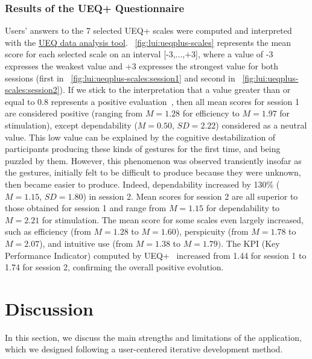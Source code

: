 \subsubsection{Results of the UEQ+ Questionnaire}
Users' answers to the 7 selected UEQ+ scales were computed and interpreted
with the \href{https://ueqplus.ueq-research.org/Material/UEQ_Plus_Data_Analysis_Tool.xlsx}{UEQ data analysis tool}. \fig~\ref{fig:lui:ueqplus-scales} represents the mean score for each selected scale on an interval [-3,...,+3], where a value of -3 expresses the weakest value and +3 expresses the strongest value for both sessions (first in \fig~\ref{fig:lui:ueqplus-scales:session1} and second in \fig~\ref{fig:lui:ueqplus-scales:session2}).
If we stick to the interpretation that a value greater than or equal to 0.8 represents a positive evaluation~\cite{Schrepp:2017}, then all mean scores for session 1 are considered positive (ranging from $M{=}1.28$ for efficiency to $M{=}1.97$ for stimulation), except dependability ($M{=}0.50$, $SD{=}2.22$) considered as a neutral value. This low value can be explained by the cognitive destabilization of participants producing these kinds of gestures for the first time, and being puzzled by them. However, this phenomenon was observed transiently insofar as the gestures, initially felt to be difficult to produce because they were unknown, then became easier to produce. Indeed, dependability increased by 130\% ($M{=}1.15$, $SD{=}1.80$) in session 2. 
Mean scores for session 2 are all superior to those obtained for session 1 and range from 
$M{=}1.15$ for dependability to $M{=}2.21$ for stimulation. The mean score for some scales even largely increased, such as efficiency (from $M{=}1.28$ to $M{=}1.60$), perspicuity (from $M{=}1.78$ to $M{=}2.07$), and intuitive use (from $M{=}1.38$ to $M{=}1.79)$.
The KPI (Key Performance Indicator) computed by UEQ+~\cite{Hinderks:2019} increased from 1.44 for session 1 to 1.74 for session 2, confirming the overall positive evolution.

\section{Discussion} \label{sec:lui:discussion}
In this section, we discuss the main strengths and limitations of the \lui application, which we designed following a user-centered iterative development method.
